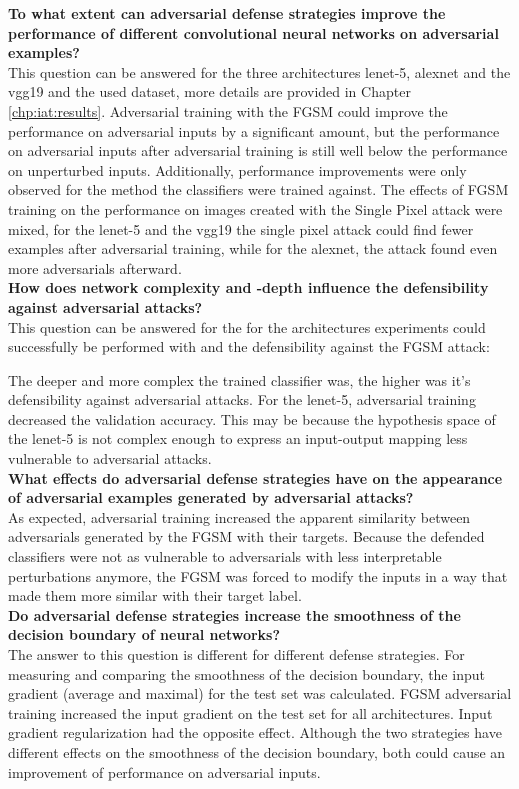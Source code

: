 \documentclass[draft,final]{vutinfth} %
\begin{document}
\textbf{To what extent can adversarial defense strategies improve the performance of different convolutional neural networks on adversarial examples?} \\
This question can be answered for the three architectures lenet-5, alexnet and the vgg19 and the used dataset, more details are provided in Chapter \ref{chp:iat:results}.
Adversarial training with the FGSM could improve the performance on adversarial inputs by a significant amount, but the performance on adversarial inputs after adversarial training is still well below the performance on unperturbed inputs.
Additionally, performance improvements were only observed for the method the classifiers were trained against.
The effects of FGSM training on the performance on images created with the Single Pixel attack were mixed, for the lenet-5 and the vgg19 the single pixel attack could find fewer examples after adversarial training, while for the alexnet, the attack found even more adversarials afterward.
\\
\textbf{How does network complexity and -depth influence the defensibility against adversarial attacks?}\\
This question can be answered for the for the architectures experiments could successfully be performed with and the defensibility against the FGSM attack:

The deeper and more complex the trained classifier was, the higher was it's defensibility against adversarial attacks.
For the lenet-5, adversarial training decreased the validation accuracy.
This may be because the hypothesis space of the lenet-5 is not complex enough to express an input-output mapping less vulnerable to adversarial attacks.\\

\textbf{What effects do adversarial defense strategies have on the appearance of adversarial examples generated by adversarial attacks?}\\
As expected, adversarial training increased the apparent similarity between adversarials generated by the FGSM with their targets.
Because the defended classifiers were not as vulnerable to adversarials with less interpretable perturbations anymore, the FGSM was forced to modify the inputs in a way that made them more similar with their target label.\\

\textbf{Do adversarial defense strategies increase the smoothness of the decision boundary of neural networks?}\\
The answer to this question is different for different defense strategies.
For measuring and comparing the smoothness of the decision boundary, the input gradient (average and maximal) for the test set was calculated.
FGSM adversarial training increased the input gradient on the test set for all architectures.
Input gradient regularization had the opposite effect.
Although the two strategies have different effects on the smoothness of the decision boundary, both could cause an improvement of performance on adversarial inputs.
\end{document}
